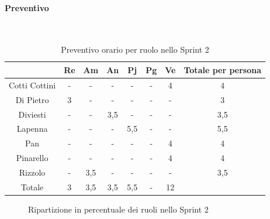 \documentclass{article}
\begin{document}
                \paragraph{Preventivo}\mbox{}\\
                \begin{table}[H]
                    \centering
                    \begin{tabular}{|c|c|c|c|c|c|c|c|}
                    \hline
                                  & Re  & Am  & An  & Pj  & Pg  & Ve  & Totale per persona \\ \hline
                    Cotti Cottini & -   & -   & -   & -   & -   & 4   & 4                  \\ \hline
                    Di Pietro     & 3   & -   & -   & -   & -   & -   & 3                  \\ \hline
                    Diviesti      & -   & -   & 3,5 & -   & -   & -   & 3,5                \\ \hline
                    Lapenna       & -   & -   & -   & 5,5 & -   & -   & 5,5                \\ \hline
                    Pan           & -   & -   & -   & -   & -   & 4   & 4                  \\ \hline
                    Pinarello     & -   & -   & -   & -   & -  & 4   & 4                 \\ \hline
                    Rizzolo       & -   & 3,5 & -   & -   & -   & -   & 3,5                \\ \hline
                    Totale        & 3   & 3,5 & 3,5 & 5,5 & -  & 12  &                    \\ \hline
                    \end{tabular}
                    \caption{Preventivo orario per ruolo nello Sprint 2}
                \end{table}


                \begin{figure}[H]
                    \centering
                    \caption{Ripartizione in percentuale dei ruoli nello Sprint 2}
                \end{figure}
\end{document}
